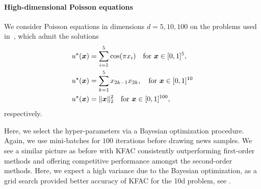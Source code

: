 \paragraph{High-dimensional Poisson equations}
We consider Poisson equations in dimensions $d=5,10,100$ on the problems used in~\cite{yu2018deep, muller2023achieving}, which admit the solutions 
\begin{align}\label{eq:solutions_poisson}
    \begin{split}
        u^\star({\bm{x}}) & = \sum_{i=1}^5 \cos(\pi x_i) \quad \text{for } {\bm{x}}\in [0,1]^{5}, \\
        u^\star({\bm{x}}) & = \sum_{k=1}^5 x_{2k-1}x_{2k},  \quad \text{for } {\bm{x}}\in [0,1]^{10} \\ 
        u^\star({\bm{x}}) & = \lVert {\bm{x}} \rVert_2^2 \quad \text{for } {\bm{x}}\in [0,1]^{100}, 
    \end{split}
\end{align}
respectively. 

Here, we select the hyper-parameters via a Bayesian optimization procedure. 
Again, we use mini-batches for $100$ iterations before drawing news samples. 
We see a similar picture as before with KFAC consistently outperforming first-order methods and offering competitive performance amongst the second-order methods. 
Here, we expect a high variance due to the Bayesian optimization, as a grid search provided better accuracy of KFAC for the 10d problem, see . 


